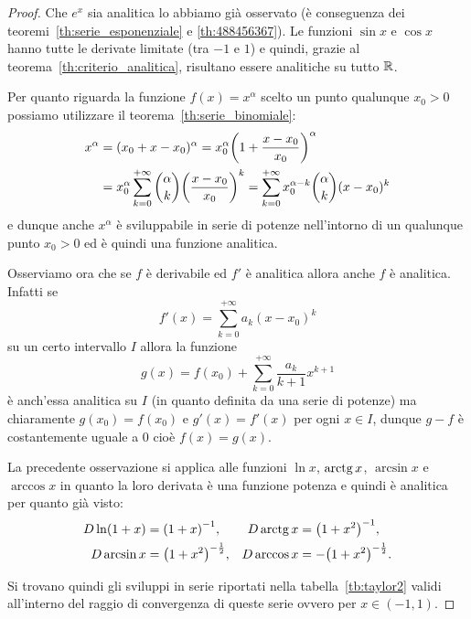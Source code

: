 \begin{proof}
  Che $e^x$ sia analitica lo abbiamo già osservato
  (è conseguenza dei teoremi~\ref{th:serie_esponenziale}
  e \ref{th:488456367}).
  Le funzioni $\sin x$ e $\cos x$ hanno tutte le derivate 
  limitate (tra $-1$ e $1$)
  e quindi, grazie al teorema~\ref{th:criterio_analitica},
  risultano essere analitiche su tutto ${\mathbb R}$.
  
  Per quanto riguarda la funzione $f(x)=x^\alpha$ 
  scelto un punto qualunque $x_0>0$
  possiamo utilizzare il teorema~\ref{th:serie_binomiale}:
    \begin{align*}
    x^\alpha
    &= (x_0 + x-x_0)^\alpha
    = x_0^\alpha {\left( 1+\frac {x-x_0} {x_0} \right)}^\alpha \\
    &= x_0^\alpha \sum_{k=0}^{+\infty} {\alpha \choose k} {\left( \frac{x-x_0}{x_0} \right)}^k
    = \sum_{k=0}^{+\infty} x_0^{\alpha-k}{\alpha \choose k} (x-x_0)^k
  \end{align*}
  e dunque anche $x^\alpha$ è sviluppabile in serie di potenze
  nell'intorno di un qualunque punto $x_0>0$ ed è quindi una
  funzione analitica.

  Osserviamo ora che se $f$ è derivabile ed $f'$ è analitica
  allora anche
  $f$ è analitica. Infatti se
  \[
    f'(x) = \sum_{k=0}^{+\infty} a_k (x-x_0)^k
  \]
  su un certo intervallo $I$
  allora la funzione
  \begin{equation}\label{eq:4569903}
    g(x) = f(x_0) + \sum_{k=0}^{+\infty} \frac{a_k}{k+1}x^{k+1}
  \end{equation}
  è anch'essa analitica su $I$ (in quanto definita da una serie di potenze)
  ma chiaramente $g(x_0) = f(x_0)$ e $g'(x) = f'(x)$ per ogni $x\in I$,
  dunque $g-f$ è costantemente uguale a $0$ cioè $f(x) = g(x)$.

  La precedente osservazione si applica alle funzioni 
  $\ln x$, $\operatorname{arctg} x$, $\arcsin x$ e $\arccos x$ 
  in quanto la loro derivata è una funzione potenza e quindi
  è analitica per quanto già visto:
  \begin{align*}
    D \ln (1+x) &= {\left( 1+x \right)}^{-1}, &
    D \operatorname{arctg} x &= {\left( 1+x^2 \right)}^{-1}, \\
    D \arcsin x &= {\left( 1+x^2 \right)}^{-\frac 1 2}, &
    D \arccos x &= -{\left( 1+x^2 \right)}^{-\frac 1 2}.
  \end{align*}

  Si trovano quindi gli sviluppi in serie riportati nella tabella~\ref{tb:taylor2}
  validi all'interno del raggio di convergenza di queste serie ovvero per $x\in (-1,1)$.


\end{proof}

